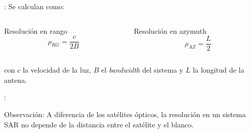 \begin{frame}{\secname : \subsecname}
  Se calculan como:
    \begin{columns}
    \begin{column}{0.5\textwidth}
     \begin{block}{Resolución en rango}
      \begin{equation}
        \rho_{RG} = \frac{c}{2B}
      \end{equation}
     \end{block}
    \end{column}
    \begin{column}{0.5\textwidth}  %
      \begin{block}{Resolución en azymuth}
        \begin{equation}
          \rho_{AZ} = \frac{L}{2}
        \end{equation}
      \end{block}
    \end{column}
    \end{columns}
    con $c$ la velocidad de la luz, $B$ el \emph{bandwidth} del sistema y $L$ la longitud de la antena.
\end{frame}

\begin{frame}{\secname : \subsecname}
  \begin{block}{Observación:}
    A diferencia de los satélites ópticos, la resolución en un sistema SAR no depende de la distancia entre el satélite y el blanco.
  \end{block}
\end{frame}
